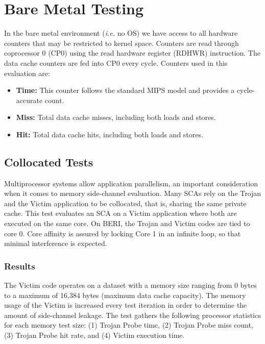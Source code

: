 	\section{Bare Metal Testing}
		In the bare metal environment (\textit{i.e.} no OS) we have access to all hardware counters that may be restricted to kernel space. Counters are read through coprocessor 0 (CP0) using the read hardware register (RDHWR) instruction. The data cache counters are fed into CP0 every cycle. Counters used in this evaluation are:
		
			\begin{itemize}
				\item \textbf{Time:} This counter follows the standard MIPS model and provides a cycle-accurate count.
				\item \textbf{Miss:} Total data cache misses, including both loads and stores.
				\item \textbf{Hit:} Total data cache hits, including both loads and stores.
			\end{itemize}
	
		\subsection{Collocated Tests}
			Multiprocessor systems allow application parallelism, an important consideration when it comes to memory side-channel evaluation. Many SCAs rely on the Trojan and the Victim application to be collocated, that is, sharing the same private cache. This test evaluates an SCA on a Victim application where both are executed on the same core. On BERI, the Trojan and Victim codes are tied to core 0. Core affinity is assured by locking Core 1 in an infinite loop, so that minimal interference is expected.

\begin{comment}
\url{Location: /home/aam53/TestsForMIPSResults/BaremetalTestResults/20151106_baremetal_core_pin/*}
\end{comment}

			\subsubsection{Results}
				The Victim code operates on a dataset with a memory size ranging from 0 bytes to a maximum of 16,384 bytes (maximum data cache capacity). The memory usage of the Victim is increased every test iteration in order to determine the amount of side-channel leakage. The test gathers the following processor statistics for each memory test size: (1) Trojan Probe time, (2) Trojan Probe miss count, (3) Trojan Probe hit rate, and (4) Victim execution time.
				
